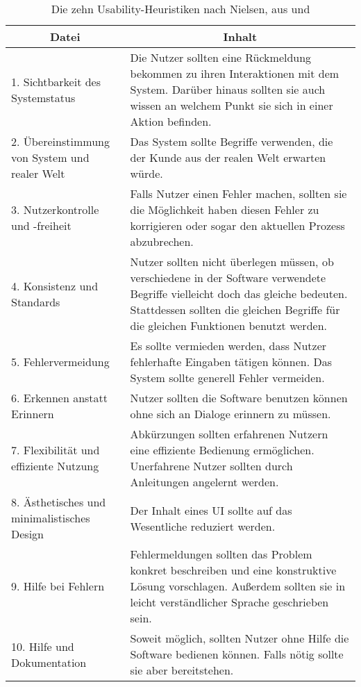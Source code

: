 \documentclass[11pt,a4paper]{report}
\begin{document}
\begin{table}[htpb]
\caption{Die zehn Usability-Heuristiken nach Nielsen, aus \cite{nielsend} und \cite{nielsen}}
\begin{center}
\begin{tabular}{|p{}|p{}|}
    \hline
    \multicolumn{1}{|c|}{\textbf{Datei}} & 
	\multicolumn{1}{|c|}{\textbf{Inhalt}} \\
    \hline
    1. Sichtbarkeit des Systemstatus & Die Nutzer sollten eine Rückmeldung bekommen zu ihren Interaktionen mit dem System. Darüber hinaus sollten sie auch wissen an welchem Punkt sie sich in einer Aktion befinden.\\
	\hline
  2. Übereinstimmung von System und realer Welt & Das System sollte Begriffe verwenden, die der Kunde aus der realen Welt erwarten würde.\\
    \hline
   3.  Nutzerkontrolle und -freiheit & Falls Nutzer einen Fehler machen, sollten sie die Möglichkeit haben diesen Fehler zu korrigieren oder sogar den aktuellen Prozess abzubrechen.	\\
    \hline
    4. Konsistenz und Standards & Nutzer sollten nicht überlegen müssen, ob verschiedene in der Software verwendete Begriffe vielleicht doch das gleiche bedeuten. Stattdessen sollten die gleichen Begriffe für die gleichen Funktionen benutzt werden.\\
    \hline
   5. Fehlervermeidung & Es sollte vermieden werden, dass Nutzer fehlerhafte Eingaben tätigen können. Das System sollte generell Fehler vermeiden. \\
   \hline
   6. Erkennen anstatt Erinnern & Nutzer sollten die Software benutzen können ohne sich an Dialoge erinnern zu müssen. \\
    \hline
  7. Flexibilität und effiziente Nutzung & Abkürzungen sollten erfahrenen Nutzern eine effiziente Bedienung ermöglichen. Unerfahrene Nutzer sollten durch Anleitungen angelernt werden. \\
    \hline
   8. Ästhetisches und minimalistisches Design & Der Inhalt eines UI sollte auf das Wesentliche reduziert werden. \\
    \hline
   9. Hilfe bei Fehlern & Fehlermeldungen sollten das Problem konkret beschreiben und eine konstruktive Lösung vorschlagen. Außerdem sollten sie in leicht verständlicher Sprache geschrieben sein. \\
    \hline
    10. Hilfe und Dokumentation & Soweit möglich, sollten Nutzer ohne Hilfe die Software bedienen können. Falls nötig sollte sie aber bereitstehen.\\
   
    \hline
\end{tabular}
\end{center}
\label{t:ui}
\end{table}
\end{document}
